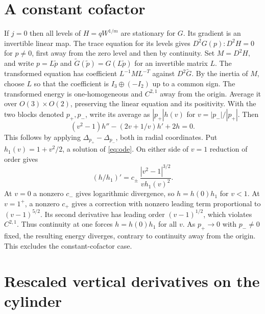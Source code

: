 \documentclass[11pt]{amsart}
\begin{document}
\section{A constant cofactor}\label{sec:constant}

If \(j=0\) then all levels of \(H=qW^{1/m}\) are stationary for \(G\).
Its gradient is an invertible linear map. The trace equation for
its levels gives \(D^2G(p):D^2H=0\) for \(p\ne0\), first away from
the zero level and then by continuity. Set \(M=D^2H\), and write
\(p=L\widetilde p\) and \(\widetilde G(\widetilde p)=G(L\widetilde p)\)
for an invertible matrix \(L\). The transformed equation has
coefficient \(L^{-1}ML^{-T}\) against \(D^2\widetilde G\).
By the inertia of \(M\), choose \(L\) so that the coefficient is
\(I_3\oplus(-I_2)\) up to a common sign. The transformed energy is
one-homogeneous and \(C^{2,1}\) away from the origin. Average it
over \(O(3)\times O(2)\), preserving the linear equation and its
positivity. With the two blocks denoted \(p_+,p_-\), write its average
as \(|p_+|h(v)\) for \(v=|p_-|/|p_+|\). Then
\begin{equation}\label{eq:ode}
 (v^2-1)h''-(2v+1/v)h'+2h=0.
\end{equation}
This follows by applying \(\Delta_{p_+}-\Delta_{p_-}\), both in
radial coordinates. Put \(h_1(v)=1+v^2/2\), a solution of \eqref{eq:ode}.
On either side of \(v=1\) reduction of order gives
\[
 (h/h_1)'=c_\pm\,\frac{|v^2-1|^{3/2}}{v h_1(v)^2}.
\]
At \(v=0\) a nonzero \(c_-\) gives logarithmic divergence, so
\(h=h(0)h_1\) for \(v<1\). At \(v=1^+\), a nonzero \(c_+\) gives
a correction with nonzero leading term proportional to
\((v-1)^{5/2}\). Its second derivative has leading order
\((v-1)^{1/2}\), which violates \(C^{2,1}\). Thus continuity at
one forces \(h=h(0)h_1\) for all \(v\). As \(p_+\to0\) with
\(p_-\ne0\) fixed, the resulting energy diverges, contrary to
continuity away from the origin. This excludes the constant-cofactor case.

\section{Rescaled vertical derivatives on the cylinder}\label{sec:derivatives}
\end{document}
